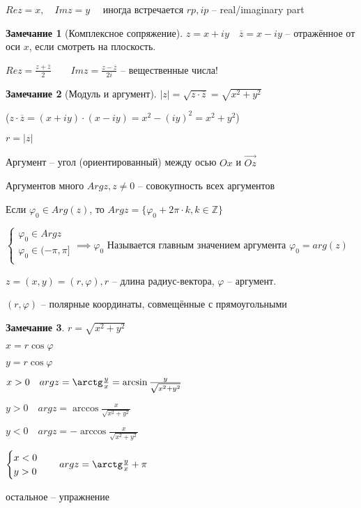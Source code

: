 \documentclass{book}
\newcommand\Z{\ensuremath{\mathbb{Z}}}
\newcommand{\ov}[1]{\overline{#1}}
\renewcommand\phi{\varphi}
\theoremstyle{definition}
\newtheorem*{note}{Замечание}
\begin{document}
        $Re z = x,\quad Im z = y\quad $ иногда встречается $rp, ip$ -- real/imaginary part

        \begin{note}
            [Комплексное сопряжение]
            $z = x+iy\quad \ov z = x-iy$ -- отражённое от оси $x$, если смотреть на плоскость.

            $Re z = \frac{z+\ov z}{2}\qquad Im z = \frac{z-\ov z}{2i}$ -- вещественные числа!
        \end{note}

        \begin{note}
            [Модуль и аргумент]

            $|z| = \sqrt{z\cdot \ov z}  = \sqrt{x^2+y^2} $ 

            ($z\cdot \ov z = (x+iy)\cdot (x-iy) = x^2-(iy)^2 = x^2+y^2$)

            $r = |z|$

            Аргумент -- угол (ориентированный) между осью $Ox$ и $\overset{\to }{Oz}$

            Аргументов много $Arg z, z\neq 0$ -- совокупность всех аргументов

            Если $\varphi_0\in Arg (z)$, то $Arg z = \{\varphi_0 + 2\pi\cdot k, k\in \Z \}$

            $\begin{cases}
                \varphi_0\in Arg z\\
                \varphi_0\in (-\pi , \pi ]\\
            \end{cases} \implies  \varphi_0$ Называется главным значением аргумента $\varphi_0 = arg(z)$ 
        \end{note}

        $z = (x,y) = (r,\phi),r$ -- длина радиус-вектора, $\phi$ --  аргумент.

        $(r, \phi)$ -- полярные координаты, совмещённые с прямоугольными
        \begin{note}
            $r = \sqrt{x^2+y^2} $

            $x = r\cos \phi$

            $y = r\cos \phi$

            $x>0\quad arg z = \arctg \frac{y}{x} = \arcsin \frac{y}{\sqrt{x^2+y^2} }$

            $y>0\quad arg z = \arccos \frac{x}{\sqrt{x^2+y^2} }$

            $y<0\quad arg z = -\arccos \frac{x}{\sqrt{x^2+y^2} } $

            $\begin{cases}
                x<0\\
                y>0\\
            \end{cases}\quad arg z = \arctg \frac{y}{x} + \pi $

            остальное -- упражнение
        \end{note}
\end{document}
